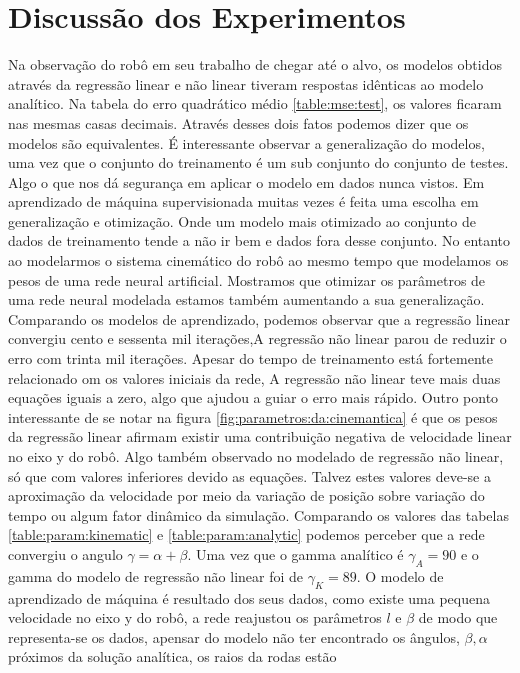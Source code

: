 \section{Discussão dos Experimentos}
Na observação do robô em seu trabalho de chegar até o alvo, os modelos
obtidos através da regressão linear e não linear tiveram respostas
idênticas ao modelo analítico. Na tabela do erro quadrático médio
\ref{table:mse:test}, os valores ficaram nas mesmas casas decimais.
Através desses dois fatos podemos dizer que os modelos são equivalentes.
É interessante  observar a generalização do modelos, uma vez que o conjunto
do treinamento é um sub conjunto do conjunto de testes.
Algo o que nos dá segurança em aplicar o modelo em dados nunca vistos.
Em aprendizado de máquina supervisionada
muitas vezes é feita uma escolha em generalização e otimização. Onde um
modelo mais otimizado ao conjunto de dados de treinamento tende a não ir
bem e dados fora desse conjunto. No entanto ao modelarmos o sistema
cinemático do robô ao mesmo tempo que modelamos os pesos de uma rede neural
artificial. Mostramos que otimizar os parâmetros de uma rede neural modelada
estamos também aumentando a sua generalização.
Comparando os modelos de aprendizado, podemos observar que a regressão
linear convergiu cento e sessenta mil iterações,A regressão não linear
parou de reduzir o erro com trinta mil iterações.  Apesar do tempo de
treinamento está fortemente relacionado om os valores iniciais da rede,
A regressão não linear teve mais duas equações iguais a zero, algo que ajudou
a guiar o erro mais rápido. Outro ponto interessante de se notar na figura
\ref{fig:parametros:da:cinemantica}
é que os pesos da regressão linear afirmam existir uma contribuição negativa
de velocidade linear no eixo y do robô. Algo também observado no modelado de
regressão não linear, só que com valores inferiores devido as equações.
Talvez estes valores deve-se a aproximação da velocidade por meio da variação
de posição sobre variação do tempo ou algum fator dinâmico da simulação.
Comparando os valores das tabelas \ref{table:param:kinematic} e \ref{table:param:analytic}
podemos perceber que a rede convergiu o angulo $\gamma = \alpha + \beta$.
Uma vez que o gamma analítico é  $\gamma_{A} = 90$ e o gamma do modelo
de regressão não linear foi de $\gamma_{K} = 89$. O modelo de aprendizado
de máquina é resultado dos seus dados, como existe uma pequena velocidade
no eixo y do robô, a rede reajustou os parâmetros $l$ e $\beta$ de modo que
representa-se os dados, apensar do modelo não ter encontrado os ângulos,
$\beta, \alpha$ próximos da solução analítica, os raios da rodas estão
